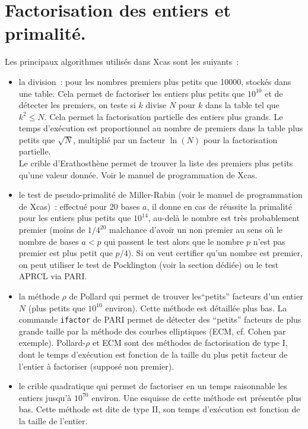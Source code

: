 \documentclass[a4paper,11pt]{article}
\begin{document}
\pagebreak
\section{Factorisation des entiers et primalit\'e.} \label{sec:ifactor}
Les principaux algorithmes utilis\'es dans Xcas sont les suivants~:
\begin{itemize}
\item la division~: pour les nombres premiers plus petits que 10000,
stock\'es dans une table. Cela permet de factoriser les entiers
plus petits que $10^{10}$ et de d\'etecter les premiers, on teste
si $k$ divise $N$ pour $k$ dans la table tel que $k^2\leq N$.
Cela permet la factorisation partielle des entiers plus grands.
Le temps d'ex\'ecution est proportionnel au nombre de premiers
dans la table plus petits que $\sqrt{N}$, multipli\'e par un facteur
$\ln(N)$ pour la factorisation partielle.\\
Le crible d'Erathosth\`ene permet de trouver la liste des premiers
plus petits qu'une valeur donn\'ee. Voir le manuel de programmation
de Xcas.
\item le test de pseudo-primalit\'e de Miller-Rabin (voir
le manuel de programmation de Xcas)~: effectu\'e
pour 20 bases $a$, il donne en cas de r\'eussite la primalit\'e
pour les entiers plus petits que $10^{14}$, au-del\`a le nombre
est tr\`es probablement premier (moins de $1/4^{20}$ malchance
d'avoir un non premier au sens o\`u le nombre de bases $a<p$ qui passent
le test alors que le nombre $p$ n'est pas premier est plus petit
que $p/4$). Si on veut certifier qu'un nombre est premier, on peut 
utiliser le test de Pocklington (voir la section
d\'edi\'ee) ou le test APRCL via PARI.
\item la m\'ethode $\rho$ de Pollard qui permet de trouver
les``petits'' facteurs d'un entier $N$ (plus petits que
$10^{10}$ environ). Cette m\'ethode est d\'etaill\'ee plus bas.
La commande \verb|ifactor| de PARI permet de d\'etecter
des ``petits'' facteurs de plus grande taille par la m\'ethode
des courbes elliptiques (ECM, cf. Cohen par exemple). Pollard-$\rho$
et ECM sont des m\'ethodes de factorisation de type I, dont le
temps d'ex\'ecution est fonction de la taille du plus petit facteur
de l'entier \`a factoriser (suppos\'e non premier).
\item le crible quadratique qui permet de factoriser
en un temps raisonnable les entiers jusqu'\`a $10^{70}$ environ.
Une esquisse de cette m\'ethode est pr\'esent\'ee plus bas.
Cette m\'ethode est dite de type II, son temps d'ex\'ecution
est fonction de la taille de l'entier.
\end{itemize}
\end{document}
